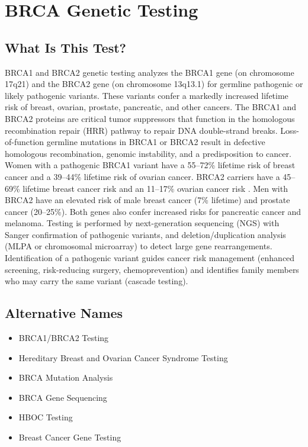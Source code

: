 \chapter{BRCA Genetic Testing}

\section*{What Is This Test?}
BRCA1 and BRCA2 genetic testing analyzes the BRCA1 gene (on chromosome 17q21) and the BRCA2 gene (on chromosome 13q13.1) for germline pathogenic or likely pathogenic variants. These variants confer a markedly increased lifetime risk of breast, ovarian, prostate, pancreatic, and other cancers. The BRCA1 and BRCA2 proteins are critical tumor suppressors that function in the homologous recombination repair (HRR) pathway to repair DNA double-strand breaks. Loss-of-function germline mutations in BRCA1 or BRCA2 result in defective homologous recombination, genomic instability, and a predisposition to cancer. Women with a pathogenic BRCA1 variant have a 55--72\% lifetime risk of breast cancer and a 39--44\% lifetime risk of ovarian cancer. BRCA2 carriers have a 45--69\% lifetime breast cancer risk and an 11--17\% ovarian cancer risk \cite{kuchenbaecker2017risks}. Men with BRCA2 have an elevated risk of male breast cancer (7\% lifetime) and prostate cancer (20--25\%). Both genes also confer increased risks for pancreatic cancer and melanoma. Testing is performed by next-generation sequencing (NGS) with Sanger confirmation of pathogenic variants, and deletion/duplication analysis (MLPA or chromosomal microarray) to detect large gene rearrangements. Identification of a pathogenic variant guides cancer risk management (enhanced screening, risk-reducing surgery, chemoprevention) and identifies family members who may carry the same variant (cascade testing).

\section*{Alternative Names}
\begin{itemize}
  \item BRCA1/BRCA2 Testing
  \item Hereditary Breast and Ovarian Cancer Syndrome Testing
  \item BRCA Mutation Analysis
  \item BRCA Gene Sequencing
  \item HBOC Testing
  \item Breast Cancer Gene Testing
\end{itemize}

